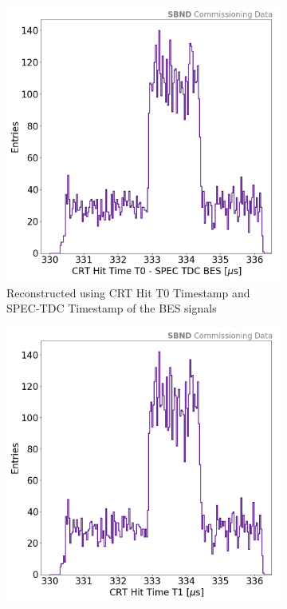 \begin{figure}[htbp!]
\begin{subfigure}[h]{0.49\linewidth}
\centering    
\includegraphics[width=\linewidth]{CRTT0_SPEC_TopHat}
\caption{Reconstructed using CRT Hit T0 Timestamp and SPEC-TDC Timestamp of the BES signals}
\end{subfigure}
\hfill
\begin{subfigure}[h]{0.49\linewidth}
\centering    
\includegraphics[width=\linewidth]{CRT_T1_TopHat}

\end{subfigure}
\end{figure}
